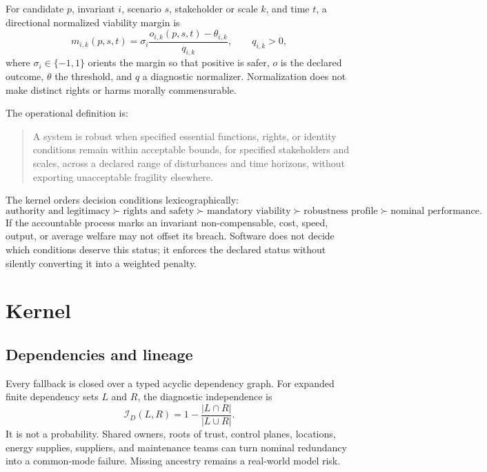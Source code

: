 \documentclass[10pt]{article}
\begin{document}
For candidate $p$, invariant $i$, scenario $s$, stakeholder or scale $k$, and
time $t$, a directional normalized viability margin is
\begin{equation}
 m_{i,k}(p,s,t)=\sigma_i\frac{o_{i,k}(p,s,t)-\theta_{i,k}}{q_{i,k}},
 \qquad q_{i,k}>0,
 \label{eq:margin}
\end{equation}
where $\sigma_i\in\{-1,1\}$ orients the margin so that positive is safer,
$o$ is the declared outcome, $\theta$ the threshold, and $q$ a diagnostic
normalizer. Normalization does not make distinct rights or harms morally
commensurable.

The operational definition is:
\begin{quote}
A system is robust when specified essential functions, rights, or identity
conditions remain within acceptable bounds, for specified stakeholders and
scales, across a declared range of disturbances and time horizons, without
exporting unacceptable fragility elsewhere.
\end{quote}

The kernel orders decision conditions lexicographically:
\begin{equation}
\text{authority and legitimacy}\succ\text{rights and safety}\succ
\text{mandatory viability}\succ\text{robustness profile}\succ
\text{nominal performance}.
\label{eq:ordering}
\end{equation}
If the accountable process marks an invariant non-compensable, cost, speed,
output, or average welfare may not offset its breach. Software does not decide
which conditions deserve this status; it enforces the declared status without
silently converting it into a weighted penalty.

\section{Kernel}

\subsection{Dependencies and lineage}

Every fallback is closed over a typed acyclic dependency graph. For expanded
finite dependency sets $L$ and $R$, the diagnostic independence is
\begin{equation}
 \mathcal I_D(L,R)=1-\frac{|L\cap R|}{|L\cup R|}.
 \label{eq:jaccard}
\end{equation}
It is not a probability. Shared owners, roots of trust, control planes,
locations, energy supplies, suppliers, and maintenance teams can turn nominal
redundancy into a common-mode failure. Missing ancestry remains a real-world
model risk.
\end{document}
